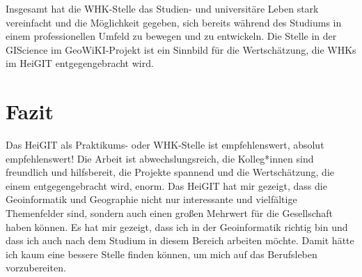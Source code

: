 \documentclass[11pt]{article}
\begin{document}
Insgesamt hat die WHK-Stelle das Studien- und universitäre Leben stark vereinfacht und die Möglichkeit gegeben, sich bereits während des Studiums in einem professionellen Umfeld zu bewegen und zu entwickeln. Die Stelle in der GIScience im GeoWiKI-Projekt ist ein Sinnbild für die Wertschätzung, die WHKs im HeiGIT entgegengebracht wird.

\section{Fazit}

Das HeiGIT als Praktikums- oder WHK-Stelle ist empfehlenswert, absolut empfehlenswert! Die Arbeit ist abwechslungsreich, die Kolleg*innen sind freundlich und hilfsbereit, die Projekte spannend und die Wertschätzung, die einem entgegengebracht wird, enorm. Das HeiGIT hat mir gezeigt, dass die Geoinformatik und Geographie nicht nur interessante und vielfältige Themenfelder sind, sondern auch einen großen Mehrwert für die Gesellschaft haben können. Es hat mir gezeigt, dass ich in der Geoinformatik richtig bin und dass ich auch nach dem Studium in diesem Bereich arbeiten möchte. Damit hätte ich kaum eine bessere Stelle finden können, um mich auf das Berufsleben vorzubereiten.

\printbibliography
\end{document}
